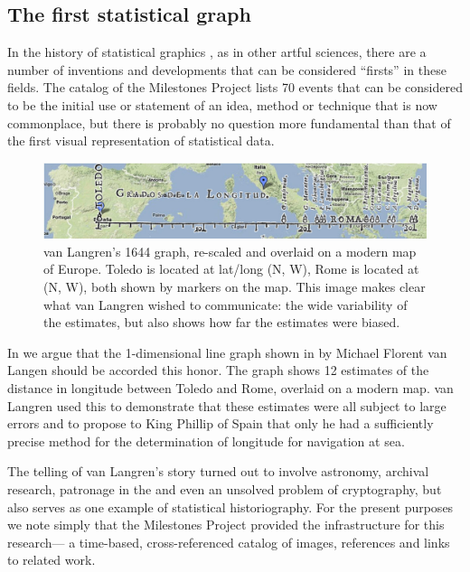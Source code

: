 \subsection{The first statistical graph}
In the history of statistical graphics \citep{Friendly:06:hbook},
as in other artful sciences, there are a number of inventions and developments
that can be considered ``firsts'' in these fields.
The catalog of the Milestones Project
\citep{FriendlyDenis:01} lists 70 events that can be considered to be the
initial use or statement of an idea, method or technique that is now
commonplace, but there is probably no question more fundamental than
that of the first visual representation of statistical data.

\begin{figure}[htb]
 \centering
 \includegraphics[width=\textwidth]{fig/langren-google-overlay}
 \caption{van Langren's 1644 graph, re-scaled and overlaid on a modern map of Europe.
 Toledo is located at
lat/long
(N, W), Rome is located at (N, W),
both shown by markers on the map.  This image makes clear what van Langren wished to communicate:
the wide variability of the estimates, but also shows how far the estimates were biased.}%
  \label{fig:langren-google-overlay}
\end{figure}

In \citet{Friendly-etal:2010:langren}
we argue that the 1-dimensional line graph shown in 
by Michael Florent
van Langen \citep{Langren:1644} should be accorded this honor.
The graph shows 12 estimates of the distance in longitude between Toledo and Rome, overlaid on a modern map.
van Langren used this to demonstrate that these estimates were all subject to large errors and to
propose to King Phillip of Spain that only he had a sufficiently precise method for the determination
of longitude for navigation at sea.

The telling of van Langren's story turned out to involve astronomy, archival research,
patronage in the  and even an unsolved problem of cryptography,
but also serves as one example of statistical historiography.  For the present purposes
we note simply that the Milestones Project provided the infrastructure for this research---
a time-based, cross-referenced catalog of images, references and links to related work.


